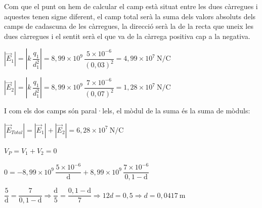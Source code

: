 \begin{solapartat}

 Com que el punt on hem de calcular el camp està situat entre les dues càrregues i aquestes tenen signe diferent, el camp total serà la suma dels valors absoluts dels camps de cadascuna de les càrregues, la direcció serà la de la recta que uneix les dues càrregues i el sentit serà el que va de la càrrega positiva cap a la negativa.

 $\left|\vec{E}_1\right| = \left|k\,\dfrac{q_1}{d_1^2}\right| = 8,99\times 10^{9}\,\dfrac{5\times 10^{-6}}{(0,03)^2} = 4,99\times 10^{7}\ \mathrm{N/C}$

 $\left|\vec{E}_2\right| = \left|k\,\dfrac{q_1}{d_1^2}\right| = 8,99\times 10^{9}\,\dfrac{7\times 10^{-6}}{(0,07)^2} = 1,28\times 10^{7}\ \mathrm{N/C}$

I com els dos camps són paral·lels, el mòdul de la suma és la suma de mòduls:

 $\left|\vec{E}_{Total}\right| = \left|\vec{E}_1\right| + \left|\vec{E}_2\right| = 6,28\times 10^{7}\ \mathrm{N/C}$
\end{solapartat}

\begin{solapartat}
 $V_P = V_1 + V_2 = 0$

 $0 = -8,99\times 10^{9}\,\dfrac{5\times 10^{-6}}{\mathrm{d}} + 8,99\times 10^{9}\,\dfrac{7\times 10^{-6}}{0,1-\mathrm{d}}$

 $\dfrac{5}{\mathrm{d}} = \dfrac{7}{0,1-\mathrm{d}} \Longrightarrow \dfrac{\mathrm{d}}{5} = \dfrac{0,1-\mathrm{d}}{7} \Longrightarrow 12d = 0,5 \Longrightarrow d = 0,0417\ \mathrm{m}$ \quad {}
\end{solapartat}
